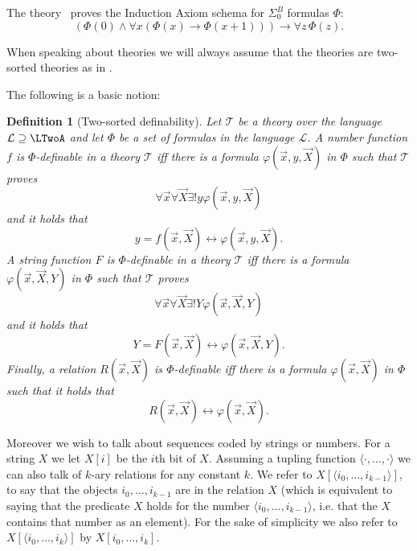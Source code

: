 \documentclass{LMCS}
\renewcommand{\And}{\land}
\newtheorem{definition}{Definition}[section]
\begin{document}
\begin{fact}
The theory \VZ\ proves the Induction Axiom schema for $\Sigma^B_0$ formulas $ \Phi $:
\[
    (\Phi(0)\And \forall x(\Phi(x)\rightarrow \Phi(x+1)) ) \rightarrow \forall z\,\Phi(z).
\]
\end{fact}

When speaking about theories we will always assume that the theories are two-sorted theories as in \cite{CN10}.

The following is a basic notion:
\begin{definition}[Two-sorted definability]\label{def:Two-sorted definabilty}
Let $\mathcal T $ be a theory over the language $ \mathcal L \supseteq \LTwoA$ and let $ \Phi $ be a set of
formulas in the language $ \mathcal L $. A number function $f$ is $\Phi $-definable in a theory $\mathcal T$ iff
there is a formula $ \varphi(\vec x,  y,\vec X)$ in $ \Phi $ such that $\mathcal T$ proves
  \begin{equation*}
    \forall\vec x\forall\vec X\exists!y\varphi(\vec x, y,\vec X)
  \end{equation*}
  and it holds that
\begin{equation}
    \label{eq:def axiom num}
    y=f(\vec x,\vec X)\leftrightarrow \varphi(\vec x,y,\vec X).
  \end{equation}
A string function $F$ is $\Phi $-definable in a theory $\mathcal T$ iff there is a formula $\varphi(\vec
  x,\vec X,Y)$ in $ \Phi $ such that $\mathcal T$ proves
  \begin{equation*}
    \forall\vec x\forall\vec X\exists!Y\varphi(\vec x,\vec X,Y)
  \end{equation*}
  and it holds that
  \begin{equation}
    \label{eq:def axiom str}
    Y=F(\vec x,\vec X)\leftrightarrow \varphi(\vec x,\vec X,Y).
  \end{equation}
Finally, a relation $R(\vec x,\vec X)$ is $\Phi $-definable iff there is a formula $\varphi(\vec x,\vec X)$ in $
\Phi $ such that it holds that
  \begin{equation}
    \label{eq:def axiom rel}
    R(\vec x,\vec X)\leftrightarrow \varphi(\vec x,\vec X).
  \end{equation}
\end{definition}

Moreover we wish to talk about sequences coded by strings or numbers. For a string $X$ we let $X[i]$ be the
$i$th bit of $X$. Assuming a tupling function $\langle \cdot,\dots,\cdot\rangle$ we can also talk of $k$-ary
relations for any constant $k$. We refer to $X[\langle i_0,\dots ,i_{k-1} \rangle]$, to say that the objects
$i_0,\dots,i_{k-1}$ are in the relation $X$ (which is equivalent to saying that the predicate $X$ holds for the
number $\langle i_0,\dots,i_{k-1}\rangle$, i.e. that the $X$ contains that number as an element). For the sake
of simplicity we also refer to $X[\langle i_0,\dots ,i_k \rangle]$ by $X[i_0,\dots ,i_k]$.
\end{document}
